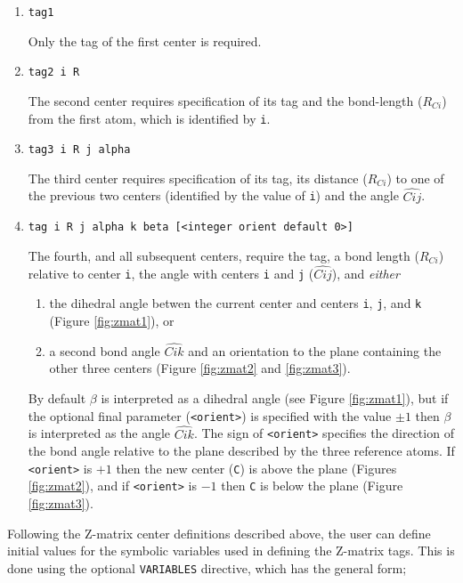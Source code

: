 \begin{enumerate}

   \item \verb+tag1+

   Only  the  tag  of the first center is required.

   \item \verb+tag2 i R+

     The second center requires specification of its tag and the
     bond-length ($R_{Ci}$) from the first atom, which is identified by
     \verb+i+.

   \item \verb+tag3 i R j alpha+

     The third center requires specification of its tag, its distance
     ($R_{Ci}$) to one of the previous two centers (identified by the
     value of \verb+i+) and the angle $\widehat{Cij}$.

   \item \verb+tag i R j alpha k beta [<integer orient default 0>]+

     The fourth, and all subsequent centers, require the tag, a bond
     length ($R_{Ci}$) relative to center \verb+i+, the angle with
     centers \verb+i+ and \verb+j+ ($\widehat{Cij}$), and {\em either} 
    \begin{enumerate}
    \item the dihedral angle betwen the current center and centers
      \verb+i+, \verb+j+, and \verb+k+ (Figure \ref{fig:zmat1}), or
      \item  a second bond angle $\widehat{Cik}$ and an orientation to 
      the plane containing the other three centers (Figure
      \ref{fig:zmat2} and \ref{fig:zmat3}).
    \end{enumerate}

    By default $\beta$ is interpreted as a dihedral angle (see Figure
    \ref{fig:zmat1}), but if the optional final parameter (\verb+<orient>+) is
    specified with the value $\pm 1$ then $\beta$ is interpreted as
    the angle $\widehat{Cik}$.  The sign of \verb+<orient>+ specifies the
    direction of the bond angle relative to the plane described by the
    three reference atoms.  If \verb+<orient>+ is $+1$ then the new center
    (\verb+C+) is above the plane (Figures \ref{fig:zmat2}), and if
    \verb+<orient>+ is $-1$ then \verb+C+ is below the plane (Figure
    \ref{fig:zmat3}).
\end{enumerate}

Following the Z-matrix center definitions described above, the user can
 define initial values for the symbolic variables used in defining the
Z-matrix tags.  This is done using the optional  \verb+VARIABLES+ directive,
which has the general form;


